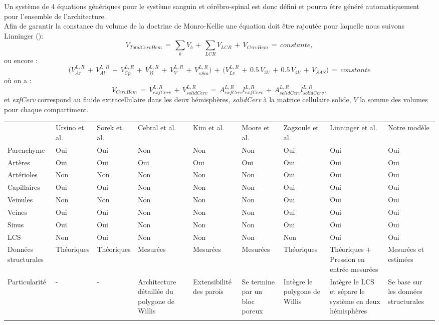Un système de 4 équations génériques pour le système sanguin et cérébro-spinal est donc
défini et pourra être généré automatiquement pour l’ensemble de l’architecture.\\
Afin de garantir la constance du volume de la doctrine de Monro-Kellie une équation doit être
rajoutée pour laquelle nous suivons Linninger (\cite{Linninger2009}):
\begin{equation}
V_{TotalCervHem}\,=\,\sum_b V_b\,+\,\sum_{LCR} V_{LCR}\,+\, V_{CervHem}\,=\,constante,
\end{equation}
ou encore :
\begin{equation}
\bigl(V_{Ar}^{L,R}\,+\,V_{Al}^{L,R}\,+\,V_{Cp}^{L,R}\,+\,V_{Vl}^{L,R}\,+\,V_{V}^{L,R}\,+\,V_{sSin}^{L,R}\bigr)\,+\,\bigl(V_{Lv}^{L,R}\,+\,0.5\,V_{3V}\,+\,0.5\,V_{4V}\,+\,V_{SAS}\bigr)\,=\,constante
\end{equation}
où on a :
\begin{equation}
V_{CervHem}\,=\,V_{exfCerv}^{L,R}\,+\,V_{solidCerv}^{L,R}\,=\,A_{exfCerv}^{L,R} l_{exfCerv}^{L,R}\,+\,A_{solidCerv}^{L,R} l_{solidCerv}^{L,R},
\end{equation}
et {\em exfCerv} correspond au fluide extracellulaire dans les deux hémisphères, {\em solidCerv} à la matrice
cellulaire solide, $V$ la somme des volumes pour chaque compartiment.\\
\begin{tabular}{ | l | l | l | l | l | l | l | l | l | }

	 & Ursino et al. & Sorek et al. & Cebral et al. & Kim et al. & Moore et al. & Zagzoule et al. & Linninger et al. & Notre modèle \\
	Parenchyme & Oui & Oui & Non & Non & Non & Oui  & Oui & Oui  \\ 
	Artères & Oui & Oui & Oui & Oui & Oui & Oui & Oui & Oui \\ 
	Artérioles & Non & Non & Non & Non & Non & Oui  & Oui  & Oui  \\ 
	Capillaires & Oui & Oui & Non & Non & Non & Oui  & Oui  & Oui  \\ 
	Veinules & Non & Non & Non & Non & Non & Oui  & Oui  & Oui  \\ 
	Veines & Oui & Oui & Non & Non & Non & Oui  & Oui  & Oui  \\ 
	Sinus & Oui & Oui & Non & Non & Non & Oui  & Oui  & Oui \\ 
	LCS & Non & Oui & Non & Non & Non & Non  & Oui  & Oui  \\ 
	Données structurales & Théoriques & Théoriques & Mesurées & Mesurées & Mesurées & Théoriques & Théoriques + Pression en entrée mesurées & Mesurées et estimées \\ 
	Particularité & - & - & Architecture détaillée du polygone de Willis & Extensibilité des parois & Se termine par un bloc poreux & Intègre le polygone de Willis & Intègre le LCS et sépare le système en deux hémisphères & Se base sur les données structurales \\ 
\label{table:tab_bilans_modeles}	
\end{tabular}

